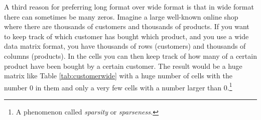 %
%
%
%
%

A third reason for preferring long format over wide format is that in wide format there can sometimes be many zeros. Imagine a large well-known online shop where there are thousands of customers and thousands of products. If you want to keep track of which customer has bought which product, and you use a wide data matrix format, you have thousands of rows (customers) and thousands of columns (products). In the cells you can then keep track of how many of a certain product have been bought by a certain customer. The result would be a huge matrix like Table \ref{tab:customerwide} with a huge number of cells with the number 0 in them and only a very few cells with a number larger than 0.\footnote{A phenomenon called \textit{sparsity} or \textit{sparseness.}}

